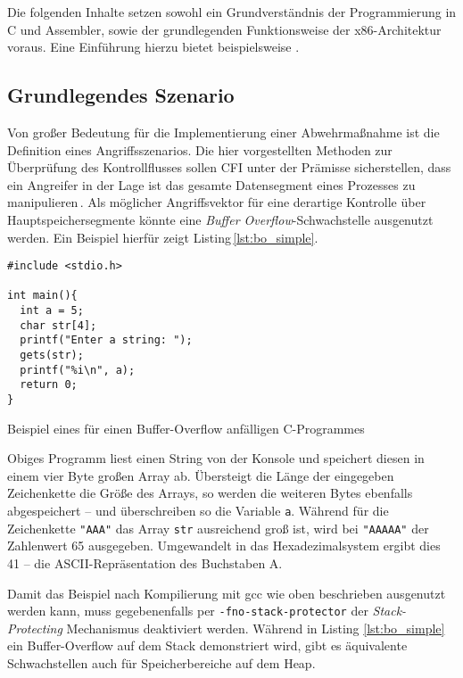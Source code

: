 \documentclass[12pt,%
               oneside,
               a4paper]{uiothesis}
\begin{document}
Die folgenden Inhalte setzen sowohl ein Grundverständnis der Programmierung in C und Assembler, sowie der grundlegenden Funktionsweise der x86-Architektur voraus. Eine Einführung hierzu bietet beispielsweise \cite[S.7-91]{Erickson.2009}.

\subsection{Grundlegendes Szenario}

Von großer Bedeutung für die Implementierung einer Abwehrmaßnahme ist die Definition eines Angriffsszenarios. Die hier vorgestellten Methoden zur Überprüfung des Kontrollflusses sollen CFI unter der Prämisse sicherstellen, dass ein Angreifer in der Lage ist das gesamte Datensegment eines Prozesses zu manipulieren\,\cite{Abadi.2009}. Als möglicher Angriffsvektor für eine derartige Kontrolle über Hauptspeichersegmente könnte eine \emph{Buffer Overflow}-Schwachstelle ausgenutzt werden. Ein Beispiel hierfür zeigt Listing\,\ref{lst:bo_simple}.

\begin{listing}
\begin{verbatim}
#include <stdio.h>

int main(){
  int a = 5;
  char str[4];
  printf("Enter a string: ");
  gets(str);
  printf("%i\n", a);
  return 0;
}
\end{verbatim}
\caption{Beispiel eines für einen Buffer-Overflow anfälligen C-Programmes}
\label{lst:bo_simple}
\end{listing}

Obiges Programm liest einen String von der Konsole und speichert diesen in einem vier Byte großen Array ab. Übersteigt die Länge der eingegeben Zeichenkette die Größe des Arrays, so werden die weiteren Bytes ebenfalls abgespeichert -- und überschreiben so die Variable \texttt{a}. Während für die Zeichenkette \texttt{"AAA"} das Array \texttt{str} ausreichend groß ist, wird bei \texttt{"AAAAA"} der Zahlenwert 65 ausgegeben. Umgewandelt in das Hexadezimalsystem ergibt dies 41 -- die ASCII-Repräsentation des Buchstaben A.


Damit das Beispiel nach Kompilierung mit gcc wie oben beschrieben ausgenutzt werden kann, muss gegebenenfalls per \texttt{-fno-stack-protector} der \emph{Stack-Protecting} Mechanismus deaktiviert werden. Während in Listing \ref{lst:bo_simple} ein Buffer-Overflow auf dem Stack demonstriert wird, gibt es äquivalente Schwachstellen auch für Speicherbereiche auf dem Heap.
\end{document}
